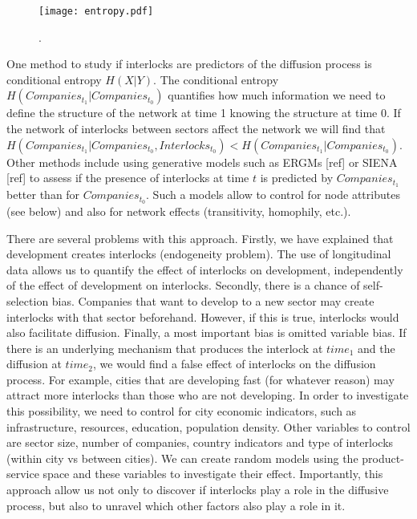 \begin{figure}
\begin{center}
\texttt{[image: entropy.pdf]}
\caption{.}
\label{fig:entropy}
\end{center}
\end{figure}

One method to study if interlocks are predictors of the diffusion process is conditional entropy $H(X|Y)$.
The conditional entropy  $H(Companies_{t_1}|Companies_{t_0})$ quantifies how much information we need to define the structure of the network at time 1 knowing the structure at time 0. 
If the network of interlocks between sectors affect the network we will find that $H(Companies_{t_1}|Companies_{t_0},Interlocks_{t_0}) < H(Companies_{t_1}|Companies_{t_0})$.
Other methods include using generative models such as ERGMs [ref] or SIENA [ref] to assess if the presence of interlocks at time $t$ is predicted by $Companies_{t_1}$
better than for $Companies_{t_0}$.
Such a models allow to control for node attributes (see below) and also for network effects (transitivity, homophily, etc.).


There are several problems with this approach.
Firstly, we have explained that development creates interlocks (endogeneity problem).
The use of longitudinal data allows us to quantify the effect of interlocks on development,
independently of the effect of development on interlocks.
Secondly, there is a chance of self-selection bias.
Companies that want to develop to a new sector may create interlocks with that sector beforehand.
However, if this is true, interlocks would also facilitate diffusion.
Finally, a most important bias is omitted variable bias.
If there is an underlying mechanism that produces the interlock at $time_1$ and the diffusion at $time_2$, 
we would find a false effect of interlocks on the diffusion process.
For example, cities that are developing fast (for whatever reason) may attract more interlocks than those who are not developing.
In order to investigate this possibility, we need to control for city economic indicators, such as infrastructure, resources, education, population density.
Other variables to control are sector size, number of companies, country indicators and type of interlocks (within city vs between cities).
We can create random models using the product-service space and these variables to investigate their effect.
Importantly, this approach allow us not only to discover if interlocks play a role in the diffusive process, 
but also to unravel which other factors also play a role in it.

